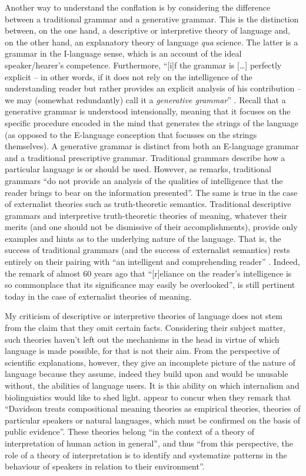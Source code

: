 Another way to understand the conflation is by considering the difference between a traditional grammar and a generative grammar. This is the distinction between, on the one hand, a descriptive or interpretive theory of language and, on the other hand, an explanatory theory of language \textit{qua} science. The latter is a grammar in the I-language sense, which is an account of the ideal speaker/hearer’s competence. Furthermore, “[i]f the grammar is […] perfectly explicit – in other words, if it does not rely on the intelligence of the understanding reader but rather provides an explicit analysis of his contribution – we may (somewhat redundantly) call it a \textit{generative grammar}” \citep[4, emphasis in original]{Chomsky1965}. Recall that a generative grammar is understood intensionally, meaning that it focuses on the specific procedure encoded in the mind that generates the strings of the language (as opposed to the E-language conception that focusses on the strings themselves). A generative grammar is distinct from both an E-language grammar and a traditional prescriptive grammar. Traditional grammars describe how a particular language is or should be used. However, as \citet[237]{Chomsky1980} remarks, traditional grammars “do not provide an analysis of the qualities of intelligence that the reader brings to bear on the information presented”. The same is true in the case of externalist theories such as truth-theoretic semantics. Traditional descriptive grammars and interpretive truth-theoretic theories of meaning, whatever their merits (and one should not be dismissive of their accomplishments), provide only examples and hints as to the underlying nature of the language. That is, the success of traditional grammars (and the success of externalist semantics) rests entirely on their pairing with “an intelligent and comprehending reader” \citep[528]{Chomsky1962}. Indeed, the remark of \citet[529]{Chomsky1962} almost 60 years ago that “[r]eliance on the reader’s intelligence is so commonplace that its significance may easily be overlooked”, is still pertinent today in the case of externalist theories of meaning.

My criticism of descriptive or interpretive theories of language does not stem from the claim that they omit certain facts. Considering their subject matter, such theories haven’t left out the mechanisms in the head in virtue of which language is made possible, for that is not their aim. From the perspective of scientific explanations, however, they give an incomplete picture of the nature of language because they assume, indeed they build upon and would be unusable without, the abilities of language users. It is this ability on which internalism and biolinguistics would like to shed light. \citet[11]{LeporeLudwig2005} appear to concur when they remark that “Davidson treats compositional meaning theories as empirical theories, theories of particular speakers or natural languages, which must be confirmed on the basis of public evidence”. These theories belong “in the context of a theory of interpretation of human action in general”, and thus “from this perspective, the role of a theory of interpretation is to identify and systematize patterns in the behaviour of speakers in relation to their environment”.

